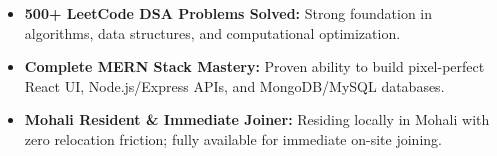 \documentclass[a4paper,10pt]{article}
\begin{document}
\begin{itemize}

    \item \textbf{500+ LeetCode DSA Problems Solved:} Strong foundation in algorithms, data structures, and computational optimization.

    \item \textbf{Complete MERN Stack Mastery:} Proven ability to build pixel-perfect React UI, Node.js/Express APIs, and MongoDB/MySQL databases.

    \item \textbf{Mohali Resident \& Immediate Joiner:} Residing locally in Mohali with zero relocation friction; fully available for immediate on-site joining.

\end{itemize}

\end{document}
